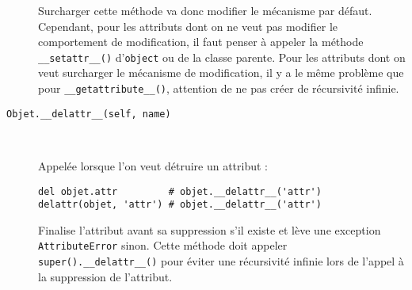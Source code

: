 \begin{description}
    Surcharger cette méthode va donc modifier le mécanisme par défaut. Cependant, pour les attributs dont on ne veut pas
    modifier le comportement de modification, il faut penser à appeler la méthode \texttt{__setattr__()} d'\texttt{object} ou de la classe parente. Pour les attributs dont on veut surcharger le mécanisme de
    modification, il y a le même problème que pour \texttt{__getattribute__()}, attention de ne pas créer 
    de récursivité infinie.

    \item[\texttt{Objet.__delattr__(self, name)}]~

    Appelée lorsque l'on veut détruire un attribut : 
    \begin{verbatim}
del objet.attr         # objet.__delattr__('attr')
delattr(objet, 'attr') # objet.__delattr__('attr')
    \end{verbatim}
    
    Finalise l'attribut avant sa suppression s'il existe et lève une exception \texttt{AttributeError} sinon. Cette méthode doit appeler \texttt{super().__delattr__()} pour éviter une récursivité infinie lors de l'appel à la suppression de l'attribut.
\end{description}  

